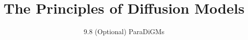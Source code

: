 ﻿%

\title{The Principles of Diffusion Models}
\subtitle{9.8 (Optional) ParaDiGMs}


\begin{frame}
    \titlepage
\end{frame}


